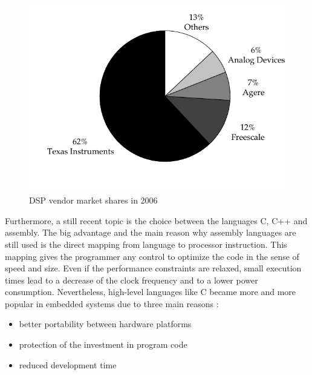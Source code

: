 \begin{figure}[htb]
	\centering
		\includegraphics[scale = 0.95]{../kapitel02/figures/dsp_market_share.pdf}
	\caption{DSP vendor market shares in 2006 \cite{strauss_dsp_market}}
	\label{fig:dsp_market_share}
\end{figure}

Furthermore, a still recent topic is the choice between the languages C, C++ and assembly. The big advantage and the main reason why assembly languages are still used is the direct mapping from language to processor instruction. This mapping gives the programmer any control to optimize the code in the sense of speed and size. Even if the performance constraints are relaxed, small execution times lead to a decrease of the clock frequency and to a lower power consumption. Nevertheless, high-level languages like C became more and more popular in embedded systems due to three main reasons \cite{dsp_high_level}:

\begin{itemize}
	\item better portability between hardware platforms
	\item protection of the investment in program code
	\item reduced development time
\end{itemize}


